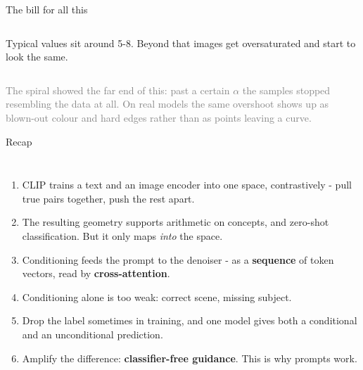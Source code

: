 \documentclass[aspectratio=169]{beamer}
\begin{document}
\begin{frame}{The bill for all this}
  \small
  \begin{columns}[T]
    \vskip 5pt
    \footnotesize
    Typical values sit around 5-8. Beyond that images get oversaturated and start to look
    the same.
  \end{columns}
  \vskip 6pt
  \footnotesize
  \textcolor{gray}{The spiral showed the far end of this: past a certain $\alpha$ the
  samples stopped resembling the data at all. On real models the same overshoot shows up
  as blown-out colour and hard edges rather than as points leaving a curve.}
\end{frame}

\begin{frame}{Recap}
  \small
  \begin{columns}[T]
    \begin{enumerate}\setlength\itemsep{2pt}
      \item CLIP trains a text and an image encoder into one space, contrastively - pull
        true pairs together, push the rest apart.
      \item The resulting geometry supports arithmetic on concepts, and zero-shot
        classification. But it only maps \emph{into} the space.
      \item Conditioning feeds the prompt to the denoiser - as a \textbf{sequence} of token
        vectors, read by \textbf{cross-attention}.
      \item Conditioning alone is too weak: correct scene, missing subject.
      \item Drop the label sometimes in training, and one model gives both a conditional
        and an unconditional prediction.
      \item Amplify the difference: \textbf{classifier-free guidance}. This is why prompts
        work.
    \end{enumerate}
    \vskip 10pt
  \end{columns}
\end{frame}
\end{document}
